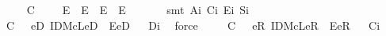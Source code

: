 \begin{isabellebody}
%
\endisadelimproof
\isanewline
\ \ \ \isamarkupfalse%
\ C\ {\isacharcolon}\ {\isachardoublequoteopen}\isactrlbold {\isasymforall}{\isasymgamma}\ {\isasymbeta}\ {\isasymalpha}{\isachardot}\ {\isacharparenleft}E{\isacharparenleft}{\isasymgamma}{\isasymcdot}{\isasymbeta}{\isacharparenright}\ \isactrlbold {\isasymand}\ E{\isacharparenleft}{\isasymbeta}{\isasymcdot}{\isasymalpha}{\isacharparenright}{\isacharparenright}\ \isactrlbold {\isasymrightarrow}\ {\isacharparenleft}E{\isacharparenleft}{\isacharparenleft}{\isasymgamma}{\isasymcdot}{\isasymbeta}{\isacharparenright}{\isasymcdot}{\isasymalpha}{\isacharparenright}\ \isactrlbold {\isasymand}\ E{\isacharparenleft}{\isasymgamma}{\isasymcdot}{\isacharparenleft}{\isasymbeta}{\isasymcdot}{\isasymalpha}{\isacharparenright}{\isacharparenright}\ \isactrlbold {\isasymand}\ {\isacharparenleft}{\isacharparenleft}{\isasymgamma}{\isasymcdot}{\isasymbeta}{\isacharparenright}{\isasymcdot}{\isasymalpha}{\isacharparenright}\ {\isacharequal}\ {\isacharparenleft}{\isasymgamma}{\isasymcdot}{\isacharparenleft}{\isasymbeta}{\isasymcdot}{\isasymalpha}{\isacharparenright}{\isacharparenright}{\isacharparenright}{\isachardoublequoteclose}%
\isadelimproof
\ %
\endisadelimproof
%
\isatagproof
{}\isamarkupfalse%
\ {\isacharparenleft}smt\ A\isactrlsub i\ C\isactrlsub i\ E\isactrlsub i\ S\isactrlsub i{\isacharparenright}%
\endisatagproof
{\isafoldproof}%
%
\isadelimproof
%
\endisadelimproof
\isanewline
\ \ \ \isamarkupfalse%
\ C\ {\isacharcolon}\ {\isachardoublequoteopen}\isactrlbold {\isasymforall}{\isasymgamma}{\isachardot}\ \isactrlbold {\isasymexists}eD{\isachardot}\ IDMcL{\isacharparenleft}eD{\isacharparenright}\ \isactrlbold {\isasymand}\ E{\isacharparenleft}{\isasymgamma}{\isasymcdot}eD{\isacharparenright}{\isachardoublequoteclose}%
\isadelimproof
\ %
\endisadelimproof
%
\isatagproof
{}\isamarkupfalse%
\ D\isactrlsub i\ \isamarkupfalse%
\ force%
\endisatagproof
{\isafoldproof}%
%
\isadelimproof
%
\endisadelimproof
\isanewline
\ \ \ \isamarkupfalse%
\ C\ {\isacharcolon}\ {\isachardoublequoteopen}\isactrlbold {\isasymforall}{\isasymgamma}{\isachardot}\ \isactrlbold {\isasymexists}eR{\isachardot}\ IDMcL{\isacharparenleft}eR{\isacharparenright}\ \isactrlbold {\isasymand}\ E{\isacharparenleft}eR{\isasymcdot}{\isasymgamma}{\isacharparenright}{\isachardoublequoteclose}%
\isadelimproof
\ %
\endisadelimproof
%
\isatagproof
{}\isamarkupfalse%
\ C\isactrlsub i\ \isamarkupfalse%

\end{isabellebody}
